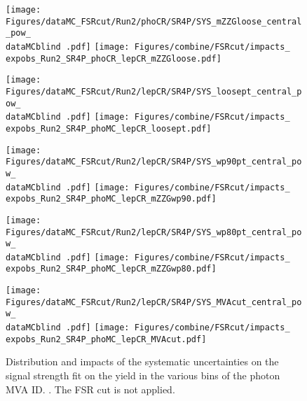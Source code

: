 \label{sec:impacts_FSRcut}

\begin{figure}
  \centering
  \texttt{[image: Figures/dataMC\_FSRcut/Run2/phoCR/SR4P/SYS\_mZZGloose\_central\_pow\_\\dataMCblind .pdf]}
  \hfill
  \texttt{[image: Figures/combine/FSRcut/impacts\_\\expobs\_Run2\_SR4P\_phoCR\_lepCR\_mZZGloose.pdf]}
  \caption{}
  \label{fig:FSRcut_cutID_phoCR_mZZGloose}
\end{figure}

\begin{figure}
  \centering
  \texttt{[image: Figures/dataMC\_FSRcut/Run2/lepCR/SR4P/SYS\_loosept\_central\_pow\_\\dataMCblind .pdf]}
  \hfill
  \texttt{[image: Figures/combine/FSRcut/impacts\_\\expobs\_Run2\_SR4P\_phoMC\_lepCR\_loosept.pdf]}
  \caption{}
  \label{fig:FSRcut_cutID_phoMC_loosept}
\end{figure}

\begin{figure}
  \centering
  \texttt{[image: Figures/dataMC\_FSRcut/Run2/lepCR/SR4P/SYS\_wp90pt\_central\_pow\_\\dataMCblind .pdf]}
  \hfill
  \texttt{[image: Figures/combine/FSRcut/impacts\_\\expobs\_Run2\_SR4P\_phoMC\_lepCR\_mZZGwp90.pdf]}
  \caption{}
  \label{fig:FSRcut_mvaID_phoMC_mZZGwp90}
\end{figure}

\begin{figure}
  \centering
  \texttt{[image: Figures/dataMC\_FSRcut/Run2/lepCR/SR4P/SYS\_wp80pt\_central\_pow\_\\dataMCblind .pdf]}
  \hfill
  \texttt{[image: Figures/combine/FSRcut/impacts\_\\expobs\_Run2\_SR4P\_phoMC\_lepCR\_mZZGwp80.pdf]}
  \caption{}
  \label{fig:FSRcut_mvaID_phoMC_mZZGwp80}
\end{figure}

\begin{figure}
  \centering
  \texttt{[image: Figures/dataMC\_FSRcut/Run2/lepCR/SR4P/SYS\_MVAcut\_central\_pow\_\\dataMCblind .pdf]}
  \hfill
  \texttt{[image: Figures/combine/FSRcut/impacts\_\\expobs\_Run2\_SR4P\_phoMC\_lepCR\_MVAcut.pdf]}
  \caption{Distribution and impacts of the systematic uncertainties on the signal strength fit
    on the yield in the various bins of the photon MVA ID.
    .
    The FSR cut is not applied.
  }
  \label{fig:FSRcut_kin_phoMC_MVAcut}
\end{figure}

